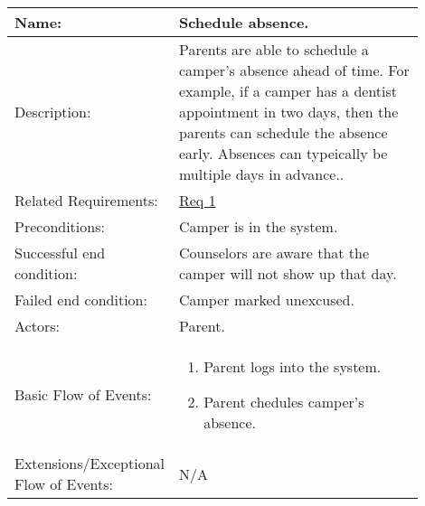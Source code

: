 \documentclass[11pt]{article}
\begin{document}
\begin{table}[!htb]
\begin{center}
\begin{tabular}{p{0.30\linewidth}p{0.60\linewidth}}
	Name: & Schedule absence.\\\hline
	Description: & Parents are able to schedule a camper's absence ahead of time. For example, if a camper has a dentist appointment in two days, then the parents can schedule the absence early. Absences can typeically be multiple days in advance..\\\hline
	Related Requirements:& \hyperlink{Req1}{Req 1}\\\hline
	Preconditions:& Camper is in the system.\\\hline
	Successful end condition:& Counselors are aware that the camper will not show up that day. \\\hline
	Failed end condition:& Camper marked unexcused.\\\hline
	Actors:& Parent. \\\hline
	Basic Flow of Events: & \begin{enumerate}[topsep=0pt]
		\item Parent logs into the system.
		\item Parent chedules camper's absence.
	\end{enumerate}\\\hline
	Extensions/Exceptional Flow of Events: & \vspace*{.25em}  N/A
\end{tabular}
\label{des:schedule absence}	
\end{center}
\end{table}



\end{document}
